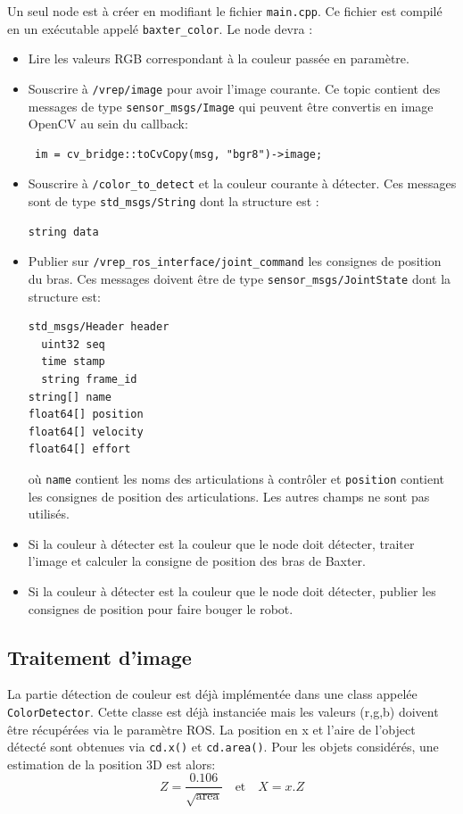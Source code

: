 \documentclass{ecnreport}
\begin{document}
Un seul node est à créer en modifiant le fichier \texttt{main.cpp}. Ce fichier est compilé en un exécutable appelé \texttt{baxter\_color}. 
Le node devra :
\begin{itemize}
\item Lire les valeurs RGB correspondant à la couleur passée en paramètre.
\item Souscrire à \texttt{/vrep/image} pour avoir l'image courante. Ce topic contient des messages de type \texttt{sensor\_msgs/Image} qui peuvent être convertis en image OpenCV au sein du callback:
\cppstyle
\begin{lstlisting}
 im = cv_bridge::toCvCopy(msg, "bgr8")->image; 
\end{lstlisting}
\item Souscrire à \texttt{/color\_to\_detect} et la couleur courante à détecter. Ces messages sont de type \texttt{std\_msgs/String} dont la structure est :
\begin{lstlisting}
string data
\end{lstlisting} 
 \item Publier sur \texttt{/vrep\_ros\_interface/joint\_command} les consignes de position du bras. Ces messages doivent être de type \texttt{sensor\_msgs/JointState} dont la structure est:
\begin{lstlisting}
std_msgs/Header header
  uint32 seq
  time stamp
  string frame_id
string[] name
float64[] position
float64[] velocity
float64[] effort
 \end{lstlisting} où \texttt{name} contient les noms des articulations à contrôler et \texttt{position} contient les consignes de position des articulations. Les autres champs
 ne sont pas utilisés.
 \item Si la couleur à détecter est la couleur que le node doit détecter, traiter l'image et calculer la consigne de position des bras de Baxter.
 \item Si la couleur à détecter est la couleur que le node doit détecter, publier les consignes de position pour faire bouger le robot.
\end{itemize}

\subsection{Traitement d'image}

La partie détection de couleur est déjà implémentée dans une class appelée  \texttt{ColorDetector}. Cette classe est déjà instanciée mais les valeurs (r,g,b) doivent être 
récupérées via le paramètre ROS. La position en x et l'aire de l'object détecté sont obtenues via \texttt{cd.x()} et \texttt{cd.area()}.
Pour les objets considérés, une estimation de la position 3D est alors:
\begin{equation*}
  Z = \displaystyle \frac{0.106}{\sqrt{\text{area}}} \quad \text{et} \quad
        X = x.Z
\end{equation*}
\end{document}
